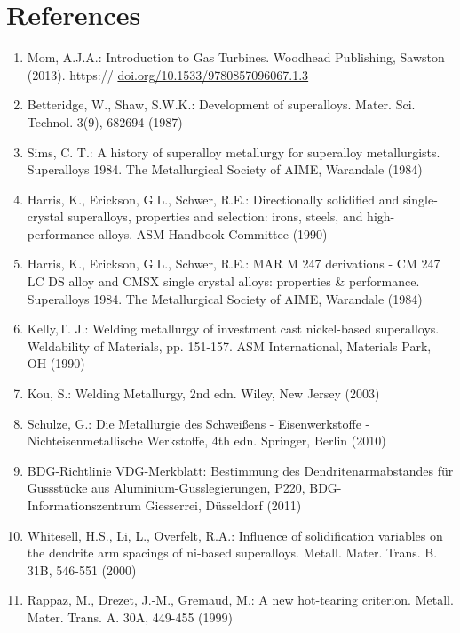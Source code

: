 \documentclass[10pt]{article}
\begin{document}
\section*{References}
\begin{enumerate}
  \item Mom, A.J.A.: Introduction to Gas Turbines. Woodhead Publishing, Sawston (2013). https:// \href{http://doi.org/10.1533/9780857096067.1.3}{doi.org/10.1533/9780857096067.1.3}

  \item Betteridge, W., Shaw, S.W.K.: Development of superalloys. Mater. Sci. Technol. 3(9), 682694 (1987)

  \item Sims, C. T.: A history of superalloy metallurgy for superalloy metallurgists. Superalloys 1984. The Metallurgical Society of AIME, Warandale (1984)

  \item Harris, K., Erickson, G.L., Schwer, R.E.: Directionally solidified and single-crystal superalloys, properties and selection: irons, steels, and high-performance alloys. ASM Handbook Committee (1990)

  \item Harris, K., Erickson, G.L., Schwer, R.E.: MAR M 247 derivations - CM 247 LC DS alloy and CMSX single crystal alloys: properties \& performance. Superalloys 1984. The Metallurgical Society of AIME, Warandale (1984)

  \item Kelly,T. J.: Welding metallurgy of investment cast nickel-based superalloys. Weldability of Materials, pp. 151-157. ASM International, Materials Park, OH (1990)

  \item Kou, S.: Welding Metallurgy, 2nd edn. Wiley, New Jersey (2003)

  \item Schulze, G.: Die Metallurgie des Schweißens - Eisenwerkstoffe - Nichteisenmetallische Werkstoffe, 4th edn. Springer, Berlin (2010)

  \item BDG-Richtlinie VDG-Merkblatt: Bestimmung des Dendritenarmabstandes für Gussstücke aus Aluminium-Gusslegierungen, P220, BDG-Informationszentrum Giesserrei, Düsseldorf (2011)

  \item Whitesell, H.S., Li, L., Overfelt, R.A.: Influence of solidification variables on the dendrite arm spacings of ni-based superalloys. Metall. Mater. Trans. B. 31B, 546-551 (2000)

  \item Rappaz, M., Drezet, J.-M., Gremaud, M.: A new hot-tearing criterion. Metall. Mater. Trans. A. 30A, 449-455 (1999)

\end{enumerate}
\end{document}
